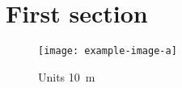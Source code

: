 \documentclass{scrbook}
\begin{document}
\section{First section}\label{section}
\begin{figure}[ht!]
  \centering
  \texttt{[image: example-image-a]}
  \caption{Units \qty{10}{\m}}
  \label{fig:example}
\end{figure}

\end{document}
